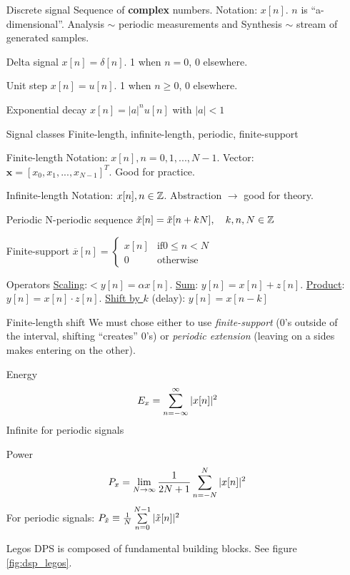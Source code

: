 \documentclass[11pt,a4paper]{article}
\begin{document}
\begin{itemize}[font=\bfseries\uline]
    \item[Discrete signal] Sequence of \textbf{complex} numbers. Notation: $x[n]$. $n$ is ``a-dimensional''. Analysis $\sim$ periodic measurements and Synthesis $\sim$ stream of generated samples.
    \item[Delta signal] $x[n] = \delta[n]$. 1 when $n=0$, 0 elsewhere.
    \item[Unit step] $x[n] = u[n]$. 1 when $n \geq 0$, 0 elsewhere.
    \item[Exponential decay] $x[n] = |a|^n u[n]$ with $|a| < 1$
    \item[Signal classes] Finite-length, infinite-length, periodic, finite-support
    \item[Finite-length] Notation: $x[n], n=0,1,...,N-1$. Vector: $\mathbf{x} = [x_0,x_1,...,x_{N-1}]^T$. Good for practice.
    \item[Infinite-length] Notation: $x[n], n\in\Z$. Abstraction $\to$ good for theory.
    \item[Periodic] N-periodic sequence $\tilde{x}[n] = \tilde{x}[n+kN],\quad k,n,N \in\Z$
    \item[Finite-support] $\overline{x}[n] = \left\{\begin{array}{ll}
    x[n] & \text{if} 0 \leq n < N\\
    0 & \text{otherwise}
\end{array}\right.$
    \item[Operators] \uline{Scaling}:$<y[n] = \alpha x[n]$. \uline{Sum}: $y[n] = x[n] + z[n]$. \uline{Product}: $y[n] = x[n]\cdot z[n]$. \uline{Shift by $k$} (delay): $y[n] = x[n-k]$
    \item[Finite-length shift] We must chose either to use \textit{finite-support} (0's outside of the interval, shifting ``creates'' 0's) or \textit{periodic extension} (leaving on a sides makes entering on the other).
    \item[Energy] 
        \begin{equation}
            E_x = \somme{\infty}{n=-\infty}|x[n]|^2
        \end{equation}
        Infinite for periodic signals
    \item[Power]
        \begin{equation}
            P_x = \limite{N\to\infty} \frac{1}{2N+1}\somme{N}{n=-N}|x[n]|^2
        \end{equation}
        For periodic signals: $P_{\tilde{x}} \equiv \frac{1}{N}\somme{N-1}{n=0}|\tilde{x}[n]|^2$
    \item[Legos] DPS is composed of fundamental building blocks. See figure \ref{fig:dsp_legos}.

\end{itemize}
\end{document}
